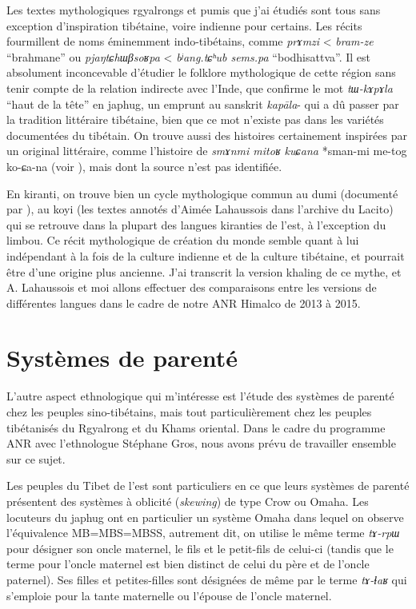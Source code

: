 \documentclass[oldfontcommands,oneside,a4paper,11pt]{memoir}
\begin{document}
Les textes mythologiques rgyalrongs et pumis que j'ai étudiés sont tous sans exception d'inspiration tibétaine, voire  indienne pour certains. Les récits fourmillent de noms éminemment indo-tibétains, comme \textit{prɤmzi} < \textit{bram-ze} ``brahmane'' ou \textit{pjaŋtɕhɯβsoʁpa} < \textit{bʲang.tɕʰub sems.pa} ``bodhisattva''. Il est absolument inconcevable d'étudier le folklore mythologique de cette région sans tenir compte de la relation indirecte avec l'Inde, que confirme le mot \textit{tɯ-kɤpɤla} ``haut de la tête'' en japhug, un emprunt au sanskrit \textit{kapāla}- qui a dû passer par la tradition littéraire tibétaine, bien que ce mot n'existe pas dans les variétés documentées du tibétain. On trouve aussi des histoires certainement inspirées par un original littéraire, comme l'histoire de \textit{smɤnmi mitoʁ kuɕana} *sman-mi me-tog ko-ɕa-na (voir \citet{jacques10gesar}), mais dont la source n'est pas identifiée.

En kiranti, on trouve bien un cycle mythologique commun au dumi (documenté par \citet{driem93dumi}), au koyi (les textes annotés d'Aimée Lahaussois dans l'archive du Lacito)  qui se retrouve dans la plupart des langues kiranties de l'est, à l'exception du limbou. Ce récit mythologique de création du monde semble quant à lui indépendant à la fois de la culture indienne et de la culture tibétaine, et pourrait être d'une origine plus ancienne. J'ai transcrit la version khaling de ce mythe, et A. Lahaussois et moi allons effectuer des comparaisons entre les versions de différentes langues dans le cadre de notre ANR Himalco de 2013 à 2015.

 

\section{Systèmes de parenté}

L'autre aspect ethnologique qui m'intéresse est l'étude des systèmes de parenté chez les peuples sino-tibétains, mais tout particulièrement chez les peuples tibétanisés du Rgyalrong et du Khams oriental. Dans le cadre du programme ANR avec l'ethnologue Stéphane Gros, nous avons prévu de travailler ensemble sur ce sujet.

Les peuples du Tibet de l'est sont particuliers en ce que leurs systèmes de parenté présentent des systèmes à oblicité (\textit{skewing}) de type Crow ou Omaha. Les locuteurs du japhug ont en particulier un système Omaha dans lequel on observe l'équivalence MB=MBS=MBSS, autrement dit, on utilise le même terme \textit{tɤ-rpɯ} pour désigner son oncle maternel, le fils et le petit-fils de celui-ci (tandis que le terme pour l'oncle maternel est bien distinct de celui du père et de l'oncle paternel). Ses filles et petites-filles sont désignées de même par le terme \textit{tɤ-ɬaʁ} qui s'emploie pour la tante maternelle ou l'épouse de l'oncle maternel.
\end{document}
